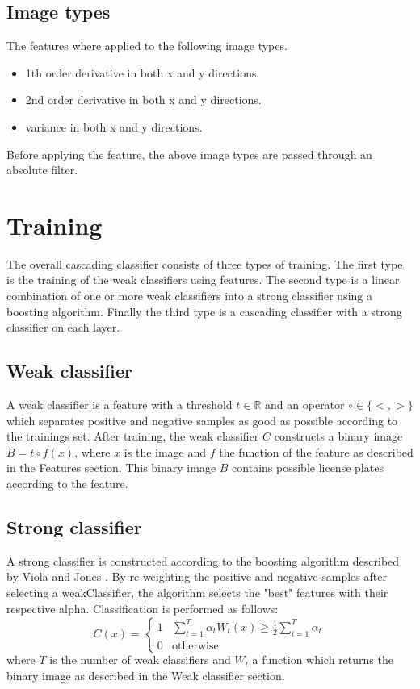 \documentclass[a4paper,11pt]{article}
\begin{document}
\subsection*{Image types}
The features where applied to the following image types.
\begin{itemize}
	\item{1th order derivative in both x and y directions.}
	\item{2nd order derivative in both x and y directions.}
	\item{variance in both x and y directions.}
\end{itemize}
Before applying the feature, the above image types are passed through an
absolute filter.


\section*{Training}
The overall cascading classifier consists of three types of training. The first
type is the training of the weak classifiers using features. The second type is
a linear combination of one or more weak classifiers into a strong classifier
using a boosting algorithm. Finally the third type is a cascading classifier
with a strong classifier on each layer.

\subsection*{Weak classifier}
A weak classifier is a feature with a threshold $t \in \mathbb{R}$ and an
operator $\circ \in \{<, >\}$ which separates positive and negative samples as
good as possible according to the trainings set. After training, the weak
classifier $C$ constructs a binary image $B = t \circ f(x)$, where $x$ is the
image and $f$ the function of the feature as described in the Features section.
This binary image $B$ contains possible license plates according to the
feature.

\subsection*{Strong classifier}
A strong classifier is constructed according to the boosting algorithm
described by Viola and Jones \cite{viola}.  By re-weighting the positive and
negative samples after selecting a weakClassifier, the algorithm selects the
"best" features with their respective alpha. Classification is performed as
follows:
\begin{displaymath}
C(x) = 
	\left\{ \begin{array}{ll}
		1 & \sum^T_{t=1} \alpha_t W_t(x) \ge \frac{1}{2} \sum^T_{t=1}\alpha_t \\
		0 & \textrm{otherwise}
	\end{array} \right.
\end{displaymath}
where $T$ is the number of weak classifiers and $W_t$ a function which returns
the binary image as described in the Weak classifier section.
\end{document}

